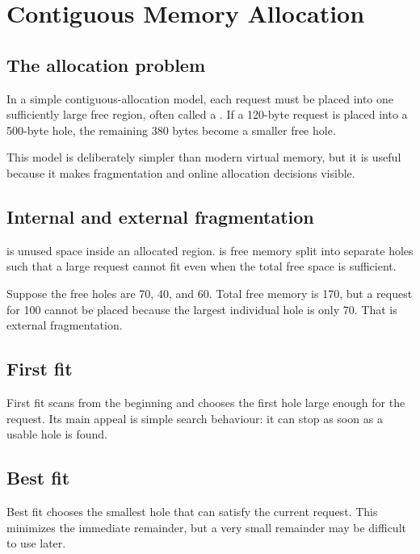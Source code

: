 \chapter{Contiguous Memory Allocation}\label{ch:allocation}

\section{The allocation problem}
In a simple contiguous-allocation model, each request must be placed into one sufficiently large free region, often called a . If a 120-byte request is placed into a 500-byte hole, the remaining 380 bytes become a smaller free hole.

This model is deliberately simpler than modern virtual memory, but it is useful because it makes fragmentation and online allocation decisions visible.

\section{Internal and external fragmentation}
 is unused space inside an allocated region.  is free memory split into separate holes such that a large request cannot fit even when the total free space is sufficient.

\begin{workedexample}
Suppose the free holes are 70, 40, and 60. Total free memory is 170, but a request for 100 cannot be placed because the largest individual hole is only 70. That is external fragmentation.
\end{workedexample}

\section{First fit}
First fit scans from the beginning and chooses the first hole large enough for the request. Its main appeal is simple search behaviour: it can stop as soon as a usable hole is found.

\section{Best fit}
Best fit chooses the smallest hole that can satisfy the current request. This minimizes the immediate remainder, but a very small remainder may be difficult to use later.

